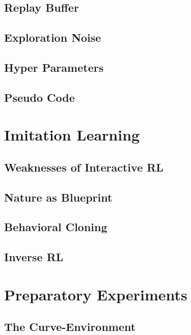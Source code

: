     \subsection{Replay Buffer}\label{subchap:buffer}
    
    \subsection{Exploration Noise}
    
    \subsection{Hyper Parameters}\label{subchap:hyperparameters}
    
    \subsection{Pseudo Code} \label{subchap:pseudo}
    
    
\newpage
\section{Imitation Learning}
    
        \subsection{Weaknesses of Interactive RL} \label{subchap:weak}
         
        \subsection{Nature as Blueprint}\label{subchap:nature}
        
        \subsection{Behavioral Cloning}
        
        \subsection{Inverse RL}\label{subchap:inverse}
        
\newpage
\section{Preparatory Experiments} \label{chap:synthetic}

    \subsection{The Curve-Environment}
        
